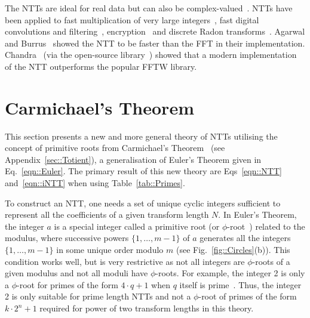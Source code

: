 \documentclass[twocolumn]{IEEEtran}
\newcommand{\modulusSymbol}{m}
\newcommand{\eqnTag}{Eq.}
\newcommand{\eqnsTag}{Eqs}
\newcommand{\figTag}{Fig.}
\newcommand{\tabTag}{Table}
\begin{document}
The \acp{NTT} are ideal for real data but can also be complex-valued~\citep{Nussbaumer1976}. \acp{NTT} have been applied to fast multiplication of very large integers~\citep{Schonhage1971}, fast digital convolutions and filtering~\citep{Agarwal1974,Agarwal1974a}, encryption~\citep{Mohan1985} and discrete Radon transforms~\citep{Chandra2010c}. Agarwal and Burrus~\citep{Agarwal1974} showed the \ac{NTT} to be faster than the \ac{FFT} in their implementation. Chandra~\citep{Chandra2010c} (via the open-source library~\citep{Chandra2009b}) showed that a modern implementation of the \ac{NTT} outperforms the popular FFTW library.

\section{Carmichael's Theorem}\label{sec::Carmichael}
This section presents a new and more general theory of \acfp{NTT} utilising the concept of primitive roots from Carmichael's Theorem~\citep{Carmichael1910} (see Appendix~\ref{sec::Totient}), a generalisation of Euler's Theorem given in \eqnTag~\eqref{eqn::Euler}. The primary result of this new theory are \eqnsTag~\eqref{eqn::NTT} and~\eqref{eqn::iNTT} when using \tabTag~\ref{tab::Primes}.

To construct an \ac{NTT}, one needs a set of unique cyclic integers sufficient to represent all the coefficients of a given transform length $N$. In Euler's Theorem, the integer $a$ is a special integer called a primitive root (or $\phi$-root~\citep{Carmichael1910}) related to the modulus, where successive powers $\{1,\ldots,\modulusSymbol-1\}$ of $a$ generates all the integers $\{1,\ldots,\modulusSymbol-1\}$ in some unique order modulo $\modulusSymbol$ (see \figTag~\ref{fig::Circles}(b)). This condition works well, but is very restrictive as not all integers are $\phi$-roots of a given modulus and not all moduli have $\phi$-roots. For example, the integer 2 is only a $\phi$-root for primes of the form $4\cdot q + 1$ when $q$ itself is prime~\citep[pg. 102]{Beiler1966}. Thus, the integer 2 is only suitable for prime length \acp{NTT} and not a $\phi$-root of primes of the form $k\cdot 2^n + 1$ required for power of two transform lengths in this theory.
\end{document}
